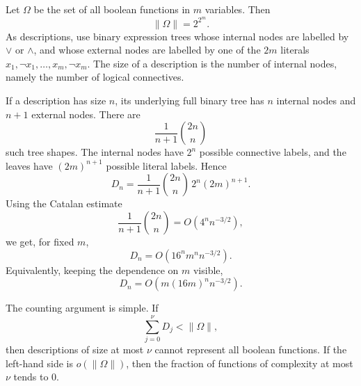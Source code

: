 
Let $\Omega$ be the set of all boolean functions in $m$ variables. Then
\begin{equation*}
    \lVert \Omega \rVert = 2^{2^{m}}.
\end{equation*}
As descriptions, use binary expression trees whose internal nodes are labelled by
$\vee$ or $\wedge$, and whose external nodes are labelled by one of the $2m$ literals
$x_{1}, \neg x_{1}, \dots, x_{m}, \neg x_{m}$. The size of a description is the number
of internal nodes, namely the number of logical connectives.

If a description has size $n$, its underlying full binary tree has $n$ internal nodes and
$n + 1$ external nodes. There are
\begin{equation*}
    \frac{1}{n + 1}\binom{2n}{n}
\end{equation*}
such tree shapes. The internal nodes have $2^{n}$ possible connective labels, and the leaves
have $(2m)^{n + 1}$ possible literal labels. Hence
\begin{equation*}
    D_{n} = \frac{1}{n + 1}\binom{2n}{n}\,2^{n}(2m)^{n + 1}.
\end{equation*}
Using the Catalan estimate
\[
    \frac{1}{n + 1}\binom{2n}{n} = O(4^{n}n^{-3/2}),
\]
we get, for fixed $m$,
\begin{equation*}
    D_{n} = O(16^{n}m^{n}n^{-3/2}).
\end{equation*}
Equivalently, keeping the dependence on $m$ visible,
\begin{equation*}
    D_{n} = O(m(16m)^{n}n^{-3/2}).
\end{equation*}

The counting argument is simple. If
\begin{equation*}
    \sum_{j = 0}^{\nu} D_{j} < \lVert \Omega \rVert,
\end{equation*}
then descriptions of size at most $\nu$ cannot represent all boolean functions. If the left-hand
side is $o(\lVert \Omega \rVert)$, then the fraction of functions of complexity at most $\nu$
tends to $0$.

